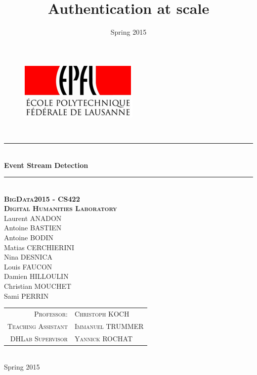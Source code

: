 \documentclass[a4paper, 11pt]{article}
\title{Authentication at scale}
\author{ }
\date{Spring 2015}
\newcommand{\HRule}{\rule{\linewidth}{0.5mm}}
\begin{document}

\begin{titlepage}
\begin{center}

\begin{figure}[h] 
\begin{center}
\begin{minipage}[c]{.45\linewidth}
\begin{center}
\includegraphics[scale=1]{images/logoEPFL.png}
\end{center}
\end{minipage}
\end{center}
\end{figure}

\hfill \\[2cm]
\HRule \\[0.5cm]
{ \Huge \bfseries Event Stream Detection}\\[0.5cm]

\HRule \\[2cm]
\makeatletter
\renewcommand{\thesection}{\@arabic\c@section}
\makeatother
\textsc{\textbf{\Large BigData2015 - CS422\\ Digital Humanities Laboratory}}\\[2cm]


\large Laurent \textsc{ANADON}\\
\large Antoine \textsc{BASTIEN}\\
\large Antoine \textsc{BODIN}\\
\large Matias \textsc{CERCHIERINI}\\
\large Nina \textsc{DESNICA}\\
\large Louis \textsc{FAUCON}\\
\large Damien \textsc{HILLOULIN}\\
\large Christian \textsc{MOUCHET}\\
\large Sami \textsc{PERRIN}\\[2cm]


\begin{tabular}{rl}
\textsc{Professor:} &\textsc{Christoph KOCH}\\
\textsc{Teaching Assistant} &\textsc{Immanuel TRUMMER}\\
\textsc{DHLab Supervisor} &\textsc{Yannick ROCHAT}
\end{tabular}

\hfill \\[1cm]
{\large Spring 2015}
\end{center}
\end{titlepage}
\end{document}
